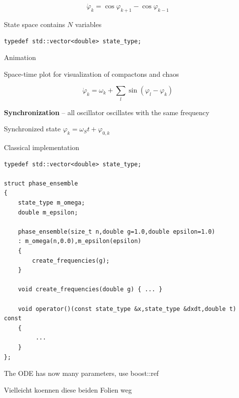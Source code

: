 \begin{frame}[fragile]
 

 \vspace{2ex}

 $$\dot{\varphi}_k = \cos \varphi_{k+1} - \cos \varphi_{k-1}$$

 \vspace{2ex}

 State space contains $N$ variables

 \begin{lstlisting}
typedef std::vector<double> state_type;
 \end{lstlisting}

 Animation

 Space-time plot for visualization of compactons and chaos

\end{frame}





\begin{frame}[fragile]


 \vspace{2ex}

$$\dot{\varphi}_k = \omega_k + \sum\limits_l \sin( \varphi_l - \varphi_k )$$

{\bf Synchronization} -- all oscillator oscillates with the same frequency

 \vspace{2ex}

Synchronized state $\varphi_k = \omega_S t + \varphi_{0,k} $

\end{frame}



\begin{frame}[fragile]

Classical implementation

\begin{lstlisting}
typedef std::vector<double> state_type;

struct phase_ensemble
{
    state_type m_omega;
    double m_epsilon;

    phase_ensemble(size_t n,double g=1.0,double epsilon=1.0)
    : m_omega(n,0.0),m_epsilon(epsilon)
    {
        create_frequencies(g);
    }

    void create_frequencies(double g) { ... }

    void operator()(const state_type &x,state_type &dxdt,double t) const
    {
         ...
    }
};
\end{lstlisting}

The ODE has now many parameters, use boost::ref

Vielleicht koennen diese beiden Folien weg

\end{frame}



